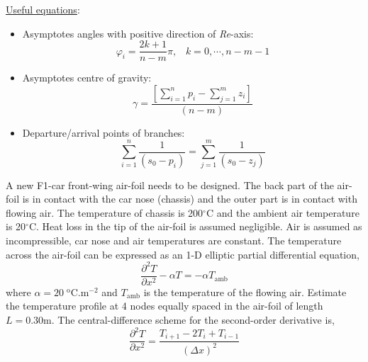 \documentclass[calculator,datasheet,resit]{exam}
\newcommand{\frc}{\displaystyle\frac}
\begin{document}
\begin{question}
\begin{enumerate}[(a)]
\end{enumerate}




\underline{Useful equations}: 
\begin{itemize}
\item Asymptotes angles with positive direction of {\it Re}-axis: 
\begin{displaymath}
\varphi_{i} = \frc{2k + 1}{n -m}\pi,\;\;\;k=0,\cdots,n-m-1
\end{displaymath}

\item Asymptotes centre of gravity:
\begin{displaymath}
\gamma=\frc{\left[\sum\limits_{i=1}^{n}p_{i}-\sum\limits_{j=1}^{m}z_{i}\right]}{(n-m)}
\end{displaymath}

\item Departure/arrival points of branches: 
\begin{displaymath}
\sum\limits_{i=1}^{n}\frc{1}{\left(s_{0}-p_{i}\right)}=\sum\limits_{j=1}^{m}\frc{1}{\left(s_{0}-z_{j}\right)}
\end{displaymath} 
\end{itemize}


\end{question}


\clearpage


\begin{question} 
A new F1-car front-wing air-foil needs to be designed. The back part of the air-foil is in contact with the car nose (chassis) and the outer part is in contact with flowing air. The temperature of chassis is 200$^{\circ}$C and the ambient air temperature is 20$^{\circ}$C. Heat loss in the tip of the air-foil is assumed negligible. Air is assumed as incompressible, car nose and air temperatures are constant. The temperature across the air-foil can be expressed as an 1-D elliptic partial differential equation,
\begin{displaymath}
\frc{\partial^{2} T}{\partial x^{2}} -\alpha T = -\alpha T_{\text{amb}}
\end{displaymath} 
where $\alpha=20\;^{\text{o}}$C.m$^{-2}$ and $T_{\text{amb}}$ is the temperature of the flowing air. Estimate the temperature profile at 4 nodes equally spaced in the air-foil of length $L=0.30$m. The central-difference scheme for the second-order derivative is,~
\begin{displaymath}
\frc{\partial^{2} T}{\partial x^{2}} = \frc{T_{i+1}-2T_{i}+T_{i-1}}{\left(\Delta x\right)^{2}}
\end{displaymath}
\end{question}
 
\end{document}
